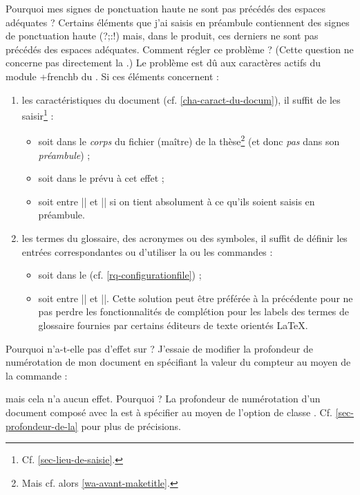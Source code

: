 \begin{dbfaq}{Pourquoi mes signes de ponctuation haute ne sont pas précédés des
    espaces adéquates ?}{}
  Certains éléments que j'ai saisis en préambule contiennent des signes de
  ponctuation haute ({\NoAutoSpacing?;:!}) mais, dans le \pdf{} produit, ces
  derniers ne sont pas précédés des espaces adéquates. Comment régler ce
  problème ?
  \tcblower
  (Cette question ne concerne pas directement la \yatCl{}.) Le problème est dû
  aux caractères actifs du module \package*+{frenchb} du . Si ces
  éléments concernent :
  \begin{enumerate}
  \item les caractéristiques du document (cf. \vref{cha-caract-du-docum}), il
    suffit de les saisir\footnote{Cf. \vref{sec-lieu-de-saisie}.} :
    \begin{itemize}
    \item soit dans le \emph{corps} du fichier (maître) de la
      thèse\footnote{Mais cf. alors \vref{wa-avant-maketitle}.} (et donc
      \emph{pas} dans son \emph{préambule}) ;
    \item soit dans le \File{\characteristicsfile} prévu à cet effet ;
    \item soit entre || et || si on tient
      absolument à ce qu'ils soient saisis en préambule.
    \end{itemize}
  \item les termes du glossaire, des acronymes ou des symboles, il suffit de
    définir les entrées correspondantes ou d'utiliser la ou les commandes
     :
    \begin{itemize}
    \item soit dans le \File{\configurationfile}
      (cf. \vref{rq-configurationfile}) ;
    \item soit entre || et ||. Cette
      solution peut être préférée à la précédente pour ne pas perdre les
      fonctionnalités de complétion pour les labels des termes de glossaire
      fournies par certains éditeurs de texte orientés \LaTeX{}.
    \end{itemize}
  \end{enumerate}
\end{dbfaq}

\begin{dbfaq}{Pourquoi \protect{} n'a-t-elle pas
    d'effet sur \protect{} ?}{}
  J'essaie de modifier la profondeur de numérotation de mon document en
  spécifiant la valeur du compteur  au moyen de la
  commande :
\begin{preamblecode}[]
\end{preamblecode}
  mais cela n'a aucun effet. Pourquoi ?
  \tcblower
  La profondeur de numérotation d'un document composé avec la \yatCl{} est
  à spécifier au moyen de l'option de classe
  . Cf. \vref{sec-profondeur-de-la} pour plus de
  précisions.
\end{dbfaq}

